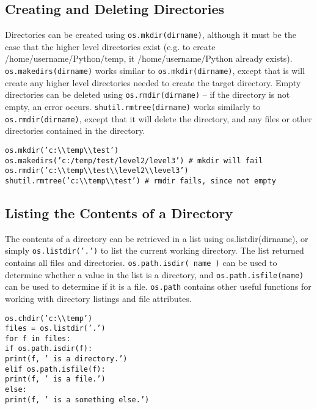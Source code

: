 \documentclass[KSmain.tex]{subfiles}
\begin{document}
\subsection{Creating and Deleting Directories}
Directories can be created using \texttt{os.mkdir(dirname)}, although it must be the case that the higher level directories
exist (e.g. to create /home/username/Python/temp, it /home/username/Python already exists). \texttt{os.makedirs(dirname)}
works similar to \texttt{os.mkdir(dirname)}, except that is will create any higher level directories needed to create
the target directory.
Empty directories can be deleted using \texttt{os.rmdir(dirname)} – if the directory is not empty, an error
occurs. \texttt{shutil.rmtree(dirname)} works similarly to \texttt{os.rmdir(dirname)}, except that it will delete the directory,
and any files or other directories contained in the directory.
\begin{framed}
\begin{verbatim}
os.mkdir(’c:\\temp\\test’)
os.makedirs(’c:/temp/test/level2/level3’) # mkdir will fail
os.rmdir(’c:\\temp\\test\\level2\\level3’)
shutil.rmtree(’c:\\temp\\test’) # rmdir fails, since not empty
\end{verbatim}
\end{framed}
\subsection{ Listing the Contents of a Directory}
The contents of a directory can be retrieved in a list using os.listdir(dirname), or simply \texttt{os.listdir(’.’)}
to list the current working directory. The list returned contains all files and directories. \texttt{os.path.isdir(
name )} can be used to determine whether a value in the list is a directory, and \texttt{os.path.isfile(name)}
can be used to determine if it is a file. \texttt{os.path} contains other useful functions for working with directory
listings and file attributes.
\begin{framed}
\begin{verbatim}
os.chdir(’c:\\temp’)
files = os.listdir(’.’)
for f in files:
if os.path.isdir(f):
print(f, ’ is a directory.’)
elif os.path.isfile(f):
print(f, ’ is a file.’)
else:
print(f, ’ is a something else.’)
\end{verbatim}
\end{framed}
\end{document}
